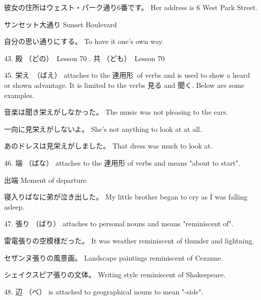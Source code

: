 \par{彼女の住所はウェスト・パーク通り6番です。 \hfill\break
Her address is 6 West Park Street. }

\par{サンセット大通り \hfill\break
Sunset Boulevard }

\par{自分の思い通りにする。 \hfill\break
To have it one's own way. }

\par{43. 殿 （どの）　\textrightarrow  Lesson 70  \hfill{}. 共 （ども）　\textrightarrow  Lesson 70  \hfill\break
}

\par{45. 栄え　（ばえ） attaches to the 連用形 of verbs and is used to show a heard or shown advantage. It is limited to the verbs 見る and 聞く. Below are some examples. }

\par{音楽は聞き栄えがしなかった。 \hfill\break
The music was not pleasing to the ears. }

\par{一向に見栄えがしないよ。 \hfill\break
She's not anything to look at at all. }

\par{あのドレスは見栄えがしました。 \hfill\break
That dress was much to look at. }

\par{46. 端 （ばな） attaches to the 連用形 of verbs and means "about to start". }

\par{出端 \hfill\break
Moment of departure }

\par{寝入りばなに弟が泣き出した。 \hfill\break
My little brother began to cry as I was falling asleep. }

\par{47. 張り （ばり） attaches to personal nouns and means "reminiscent of". }

\par{雷電張りの空模様だった。 \hfill\break
It was weather reminiscent of thunder and lightning. }

\par{セザンヌ張りの風景画。 \hfill\break
Landscape paintings reminiscent of Cezanne. }

\par{シェイクスピア張りの文体。 \hfill\break
Writing style reminiscent of Shakespeare. }

\par{48. 辺 （べ） is attached to geographical nouns to mean "-side". }

